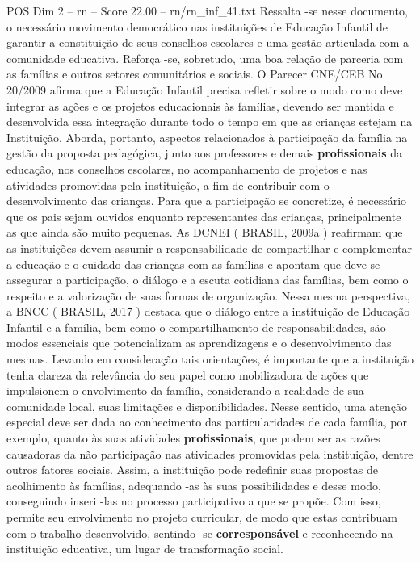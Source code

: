\begin{textsample}{POS Dim 2 – rn – Score 22.00 – rn/rn\_inf\_41.txt}
Ressalta -se nesse documento, o necessário movimento democrático nas instituições de Educação Infantil de garantir a constituição de seus conselhos escolares e uma gestão articulada com a comunidade educativa.
Reforça -se, sobretudo, uma boa relação de parceria com as famílias e outros setores comunitários e sociais.
O Parecer CNE/CEB No 20/2009 afirma que a Educação Infantil precisa refletir sobre o modo como deve integrar as ações e os projetos educacionais às famílias, devendo ser mantida e desenvolvida essa integração durante todo o tempo em que as crianças estejam na Instituição.
Aborda, portanto, aspectos relacionados à participação da família na gestão da proposta pedagógica, junto aos professores e demais \textbf{profissionais} da educação, nos conselhos escolares, no acompanhamento de projetos e nas atividades promovidas pela instituição, a fim de contribuir com o desenvolvimento das crianças.
Para que a participação se concretize, é necessário que os pais sejam ouvidos enquanto representantes das crianças, principalmente as que ainda são muito pequenas.
As DCNEI ( BRASIL, 2009a ) reafirmam que as instituições devem assumir a responsabilidade de compartilhar e complementar a educação e o cuidado das crianças com as famílias e apontam que deve se assegurar a participação, o diálogo e a escuta cotidiana das famílias, bem como o respeito e a valorização de suas formas de organização.
Nessa mesma perspectiva, a BNCC ( BRASIL, 2017 ) destaca que o diálogo entre a instituição de Educação Infantil e a família, bem como o compartilhamento de responsabilidades, são modos essenciais que potencializam as aprendizagens e o desenvolvimento das mesmas.
Levando em consideração tais orientações, é importante que a instituição tenha clareza da relevância do seu papel como mobilizadora de ações que impulsionem o envolvimento da família, considerando a realidade de sua comunidade local, suas limitações e disponibilidades.
Nesse sentido, uma atenção especial deve ser dada ao conhecimento das particularidades de cada família, por exemplo, quanto às suas atividades \textbf{profissionais}, que podem ser as razões causadoras da não participação nas atividades promovidas pela instituição, dentre outros fatores sociais.
Assim, a instituição pode redefinir suas propostas de acolhimento às famílias, adequando -as às suas possibilidades e desse modo, conseguindo inseri -las no processo participativo a que se propõe.
Com isso, permite seu envolvimento no projeto curricular, de modo que estas contribuam com o trabalho desenvolvido, sentindo -se \textbf{corresponsável} e reconhecendo na instituição educativa, um lugar de transformação social.

\end{textsample}
